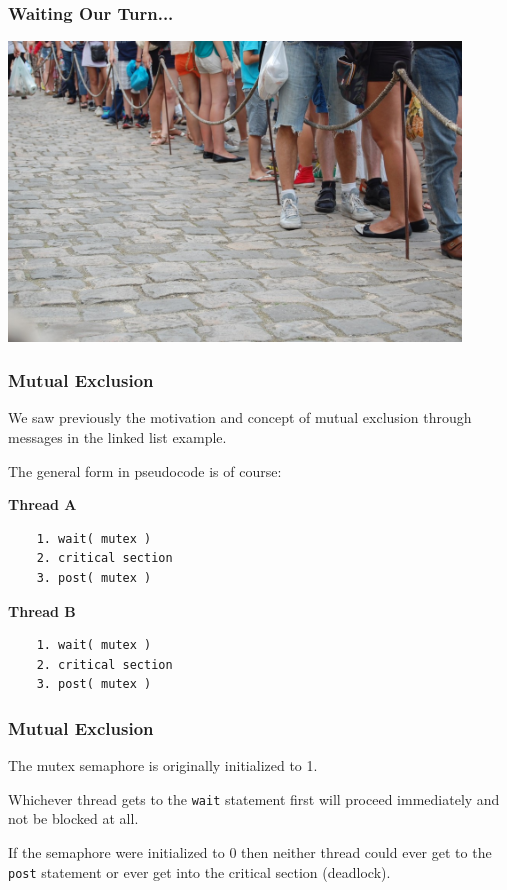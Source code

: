 \begin{frame}
	\frametitle{Waiting Our Turn...}

	\begin{center}
		\includegraphics[width=0.9\textwidth]{images/waiting-in-line.jpg}
	\end{center}

\end{frame}


\begin{frame}[fragile]
	\frametitle{Mutual Exclusion}

	We saw previously the motivation and concept of mutual exclusion through messages in the linked list example.

	The general form in pseudocode is of course:

	\begin{multicols}{2}
		\textbf{Thread A}
		\begin{verbatim}
	1. wait( mutex )
	2. critical section
	3. post( mutex )
  \end{verbatim}
		\columnbreak
		\textbf{Thread B}
		\begin{verbatim}
	1. wait( mutex )
	2. critical section
	3. post( mutex )
  \end{verbatim}
	\end{multicols}
	\vspace{-2em}


\end{frame}

\begin{frame}
	\frametitle{Mutual Exclusion}

	The mutex semaphore is originally initialized to 1.

	Whichever thread gets to the \texttt{wait} statement first will proceed immediately and not be blocked at all.

	If the semaphore were initialized to 0 then neither thread could ever get to the \texttt{post} statement or ever get into the critical section (deadlock).


\end{frame}


